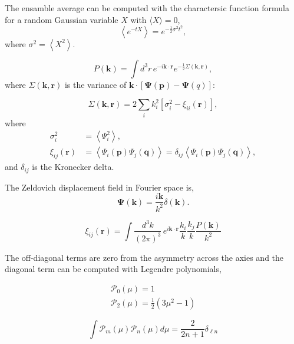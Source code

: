 \documentclass[a4paper,11pt]{article}
\begin{document}
The ensamble average can be computed with the charactersic function formula
for a random Gaussian variable $X$ with $\langle X \rangle = 0$,
\begin{equation}
  \left\langle e^{-t X} \right\rangle = e^{-\frac{1}{2} \sigma^2 t^2},
\end{equation}
where $\sigma^2 = \left\langle X^2 \right\rangle$.

\begin{equation}
  P(\bm{k}) = \int d^3 r \, e^{-i \bm{k} \cdot \bm{r}}
    e^{-\frac{1}{2} \Sigma(\bm{k}, \bm{r})},
\end{equation}
where $\Sigma(\bm{k}, \bm{r})$ is the variance of $\bm{k} \cdot \left[
  \bm{\Psi}(\bm{p}) - \bm{\Psi}(q) \right]$:

\begin{equation}
  \Sigma(\bm{k}, \bm{r}) = 2 \sum_i k_i^2 \left[ \sigma_i^2 - \xi_{ii}(\bm{r}) \right],
\end{equation}
where
\begin{align}
  \sigma^2_i       &= \left\langle \Psi_i^2 \right\rangle,\\
  \xi_{ij}(\bm{r}) &= \left\langle \Psi_i(\bm{p}) \Psi_j(\bm{q}) \right\rangle
                   = \delta_{ij} \left\langle \Psi_i(\bm{p}) \Psi_j(\bm{q}) \right\rangle,
\end{align}
and $\delta_{ij}$ is the Kronecker delta.

The Zeldovich displacement field in Fourier space is,
\begin{equation}
  \bm{\Psi}(\bm{k}) = \frac{i\bm{k}}{k^2} \delta(\bm{k}).
\end{equation}



\begin{equation}
  \xi_{ij}(\bm{r}) = \int \frac{d^3 k}{(2\pi)^3}\,
                    e^{i\bm{k} \cdot \bm{r}} \frac{k_i}{k} \frac{k_j}{k}
                    \frac{P(\bm{k})}{k^2}
\end{equation}

The off-diagonal terms are zero from the asymmetry across the axies
and the diagonal term can be computed with Legendre polynomials,

\begin{align}
  \mathcal{P}_0(\mu) = 1\\
  \mathcal{P}_2(\mu) = \frac{1}{2} \left( 3 \mu^2 - 1 \right)
\end{align}

\begin{equation}
  \int \mathcal{P}_m(\mu) \mathcal{P}_n(\mu) d\mu =
     \frac{2}{2 n + 1} \delta_{\ell n}
\end{equation}
\end{document}

